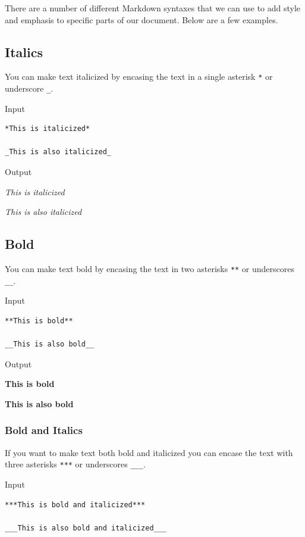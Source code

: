 \documentclass[
]{book}
\begin{document}
There are a number of different Markdown syntaxes that we can use to add style and emphasis to specific parts of our document. Below are a few examples.

\hypertarget{italics}{%
\subsection*{Italics}\label{italics}}

You can make text italicized by encasing the text in a single asterisk \texttt{*} or underscore \texttt{\_}.

Input

\begin{verbatim}
*This is italicized*

_This is also italicized_
\end{verbatim}

Output

\emph{This is italicized}

\emph{This is also italicized}

\hypertarget{bold}{%
\subsection*{Bold}\label{bold}}

You can make text bold by encasing the text in two asterisks \texttt{**} or underscores
\texttt{\_\_}.

Input

\begin{verbatim}
**This is bold**

__This is also bold__
\end{verbatim}

Output

\textbf{This is bold}

\textbf{This is also bold}

\hypertarget{bold-and-italics}{%
\subsubsection*{Bold and Italics}\label{bold-and-italics}}

If you want to make text both bold and italicized you can encase the text with three asterisks \texttt{***} or underscores \texttt{\_\_\_}.

Input

\begin{verbatim}
***This is bold and italicized***

___This is also bold and italicized___
\end{verbatim}
\end{document}
